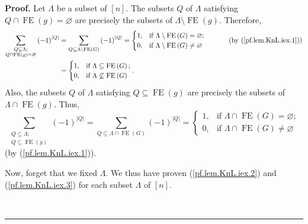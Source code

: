 \documentclass[numbers=enddot,12pt,final,onecolumn,notitlepage]{scrartcl}%
\theoremstyle{definition}
\newenvironment{proof}[1][Proof]{\noindent\textbf{#1.} }{\ \rule{0.5em}{0.5em}}
\newenvironment{verlong}{}{}
\let\sumnonlimits\sum
\renewcommand{\sum}{\sumnonlimits\limits}
\begin{document}
\begin{verlong}
\begin{proof}
Let $\Lambda$ be a subset of $\left[  n\right]  $. The subsets $Q$ of
$\Lambda$ satisfying $Q\cap\operatorname*{FE}\left(  g\right)  =\varnothing$
are precisely the subsets of $\Lambda\setminus\operatorname*{FE}\left(
g\right)  $. Therefore,
\begin{align}
\sum_{\substack{Q\subseteq\Lambda;\\Q\cap\operatorname*{FE}\left(  g\right)
=\varnothing}}\left(  -1\right)  ^{\left\vert Q\right\vert }  &
=\sum_{Q\subseteq\Lambda\setminus\operatorname*{FE}\left(  G\right)  }\left(
-1\right)  ^{\left\vert Q\right\vert }=%
\begin{cases}
1, & \text{if }\Lambda\setminus\operatorname*{FE}\left(  G\right)
=\varnothing;\\
0, & \text{if }\Lambda\setminus\operatorname*{FE}\left(  G\right)
\neq\varnothing
\end{cases}
\ \ \ \ \ \ \ \ \ \ \left(  \text{by (\ref{pf.lem.KnL.iex.1})}\right)
\nonumber\\
&  =%
\begin{cases}
1, & \text{if }\Lambda\subseteq\operatorname*{FE}\left(  G\right)  ;\\
0, & \text{if }\Lambda\not \subseteq \operatorname*{FE}\left(  G\right)
\end{cases}
. \label{pf.lem.KnL.iex.2}%
\end{align}
Also, the subsets $Q$ of $\Lambda$ satisfying $Q\subseteq\operatorname*{FE}%
\left(  g\right)  $ are precisely the subsets of $\Lambda\cap
\operatorname*{FE}\left(  g\right)  $. Thus,%
\begin{equation}
\sum_{\substack{Q\subseteq\Lambda;\\Q\subseteq\operatorname*{FE}\left(
g\right)  }}\left(  -1\right)  ^{\left\vert Q\right\vert }=\sum_{Q\subseteq
\Lambda\cap\operatorname*{FE}\left(  G\right)  }\left(  -1\right)
^{\left\vert Q\right\vert }=%
\begin{cases}
1, & \text{if }\Lambda\cap\operatorname*{FE}\left(  G\right)  =\varnothing;\\
0, & \text{if }\Lambda\cap\operatorname*{FE}\left(  G\right)  \neq\varnothing
\end{cases}
\label{pf.lem.KnL.iex.3}%
\end{equation}
(by (\ref{pf.lem.KnL.iex.1})).

Now, forget that we fixed $\Lambda$. We thus have proven
(\ref{pf.lem.KnL.iex.2}) and (\ref{pf.lem.KnL.iex.3}) for each subset
$\Lambda$ of $\left[  n\right]  $.


\end{proof}
\end{verlong}
\end{document}
